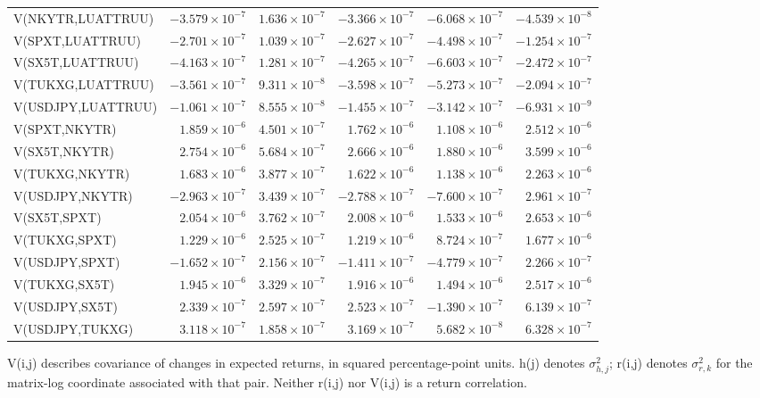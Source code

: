\documentclass[10pt,a4paper]{article}
\begin{document}
\begin{tabular*}{\linewidth}{@{\extracolsep{\fill}}lrrrrr@{}}
V(NKYTR,LUATTRUU) & $-3.579\times10^{-7}$ & $1.636\times10^{-7}$ & $-3.366\times10^{-7}$ & $-6.068\times10^{-7}$ & $-4.539\times10^{-8}$ \\
V(SPXT,LUATTRUU) & $-2.701\times10^{-7}$ & $1.039\times10^{-7}$ & $-2.627\times10^{-7}$ & $-4.498\times10^{-7}$ & $-1.254\times10^{-7}$ \\
V(SX5T,LUATTRUU) & $-4.163\times10^{-7}$ & $1.281\times10^{-7}$ & $-4.265\times10^{-7}$ & $-6.603\times10^{-7}$ & $-2.472\times10^{-7}$ \\
V(TUKXG,LUATTRUU) & $-3.561\times10^{-7}$ & $9.311\times10^{-8}$ & $-3.598\times10^{-7}$ & $-5.273\times10^{-7}$ & $-2.094\times10^{-7}$ \\
V(USDJPY,LUATTRUU) & $-1.061\times10^{-7}$ & $8.555\times10^{-8}$ & $-1.455\times10^{-7}$ & $-3.142\times10^{-7}$ & $-6.931\times10^{-9}$ \\
V(SPXT,NKYTR) & $1.859\times10^{-6}$ & $4.501\times10^{-7}$ & $1.762\times10^{-6}$ & $1.108\times10^{-6}$ & $2.512\times10^{-6}$ \\
V(SX5T,NKYTR) & $2.754\times10^{-6}$ & $5.684\times10^{-7}$ & $2.666\times10^{-6}$ & $1.880\times10^{-6}$ & $3.599\times10^{-6}$ \\
V(TUKXG,NKYTR) & $1.683\times10^{-6}$ & $3.877\times10^{-7}$ & $1.622\times10^{-6}$ & $1.138\times10^{-6}$ & $2.263\times10^{-6}$ \\
V(USDJPY,NKYTR) & $-2.963\times10^{-7}$ & $3.439\times10^{-7}$ & $-2.788\times10^{-7}$ & $-7.600\times10^{-7}$ & $2.961\times10^{-7}$ \\
V(SX5T,SPXT) & $2.054\times10^{-6}$ & $3.762\times10^{-7}$ & $2.008\times10^{-6}$ & $1.533\times10^{-6}$ & $2.653\times10^{-6}$ \\
V(TUKXG,SPXT) & $1.229\times10^{-6}$ & $2.525\times10^{-7}$ & $1.219\times10^{-6}$ & $8.724\times10^{-7}$ & $1.677\times10^{-6}$ \\
V(USDJPY,SPXT) & $-1.652\times10^{-7}$ & $2.156\times10^{-7}$ & $-1.411\times10^{-7}$ & $-4.779\times10^{-7}$ & $2.266\times10^{-7}$ \\
V(TUKXG,SX5T) & $1.945\times10^{-6}$ & $3.329\times10^{-7}$ & $1.916\times10^{-6}$ & $1.494\times10^{-6}$ & $2.517\times10^{-6}$ \\
V(USDJPY,SX5T) & $2.339\times10^{-7}$ & $2.597\times10^{-7}$ & $2.523\times10^{-7}$ & $-1.390\times10^{-7}$ & $6.139\times10^{-7}$ \\
V(USDJPY,TUKXG) & $3.118\times10^{-7}$ & $1.858\times10^{-7}$ & $3.169\times10^{-7}$ & $5.682\times10^{-8}$ & $6.328\times10^{-7}$ \\
\bottomrule
\end{tabular*}\endgroup
\par\medskip\footnotesize
V(i,j) describes covariance of changes in expected returns, in squared percentage-point units.
h(j) denotes $\sigma_{h,j}^{2}$; r(i,j) denotes $\sigma_{r,k}^{2}$ for the matrix-log coordinate
associated with that pair. Neither r(i,j) nor V(i,j) is a return correlation.
\end{document}
